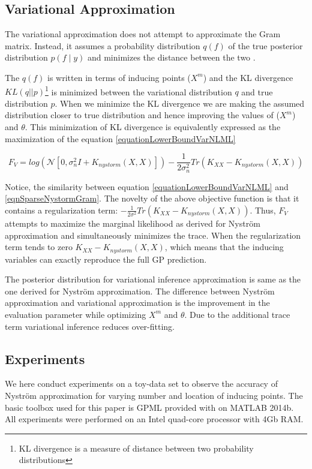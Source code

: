 \subsection{Variational Approximation}\label{subSecVariationalApprox} 
The variational approximation does not attempt to approximate the Gram matrix. Instead, it assumes a probability distribution \(q(f)\) of the true posterior distribution \(p(f \mid y)\) and minimizes the distance between the two \cite{Titsias09variationallearning}. 

The \(q(f)\) is written in terms of inducing points (\(X^{m}\)) and the KL divergence \(KL(q||p)\)\footnote{KL divergence is a measure of distance between two probability distributions} is minimized between the variational distribution \(q\) and true distribution \(p\). When we minimize the KL divergence we are making the assumed distribution closer to true distribution and hence improving the values of (\(X^{m}\)) and \(\theta \). This minimization of KL divergence is equivalently expressed as the maximization of the equation \ref{equationLowerBoundVarNLML}

\begin{equation}\label{equationLowerBoundVarNLML}
F_{V} = log(\mathcal{N}[0, \sigma_{n}^{2}I + K_{nystorm}(X, X)]) - \frac{1}{2\sigma_{n}^{2}}Tr(K_{XX} - K_{nystorm}(X, X))
\end{equation}

Notice, the similarity between equation \ref{equationLowerBoundVarNLML} and \ref{eqnSparseNystormGram}. The novelty of the above objective function is that it contains a regularization term: \(- \frac{1}{2\sigma ^{2}}Tr(K_{XX} - K_{nystorm}(X, X))\). Thus, \(F_{V}\) attempts to maximize the marginal likelihood as derived for Nystr\"{o}m approximation and simultaneously minimizes the trace. When the regularization term tends to zero \(K_{XX} - K_{nystorm}(X, X)\), which means that the inducing variables can exactly reproduce the full GP prediction. 

The posterior distribution for variational inference approximation is same as the one derived for Nystr\"{o}m approximation. The difference between Nystr\"{o}m approximation and variational approximation is the improvement in the evaluation parameter while optimizing \(X^{m}\) and \(\theta\). Due to the additional trace term variational inference reduces over-fitting.

\subsection{Experiments}\label{subsecNystromExperiments}
We here conduct experiments on a toy-data set to observe the accuracy of Nystr\"{o}m approximation for varying number and location of inducing points. The basic toolbox used for this paper is GPML provided with \cite{rasmussen2006gaussian} on MATLAB 2014b. All experiments were performed on an Intel quad-core processor with 4Gb RAM. 

